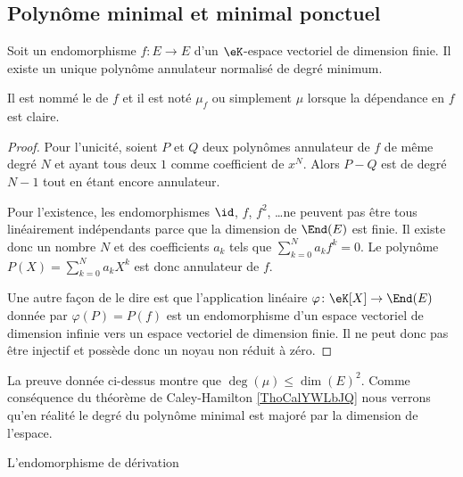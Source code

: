 \subsection{Polynôme minimal et minimal ponctuel}

\begin{lemmaDef}        \label{DefooOHUXooNkPWaB}
    Soit un endomorphisme \( f\colon E\to E\) d'un \( \eK\)-espace vectoriel de dimension finie. Il existe un unique polynôme annulateur normalisé de degré minimum.

    Il est nommé le  de \( f\) et il est noté \( \mu_f\) ou simplement \( \mu\) lorsque la dépendance en \( f\) est claire.
\end{lemmaDef}

\begin{proof}
    Pour l'unicité, soient \( P\) et \( Q\) deux polynômes annulateur de \( f\) de même degré \( N\) et ayant tous deux \( 1\) comme coefficient de \( x^N\). Alors \( P-Q\) est de degré \( N-1\) tout en étant encore annulateur.

    Pour l'existence, les endomorphismes \( \id\), \( f\), \( f^2\), \ldots ne peuvent pas être tous linéairement indépendants parce que la dimension de \( \End(E)\) est finie. Il existe donc un nombre \( N\) et des coefficients \( a_k\) tels que \( \sum_{k=0}^Na_kf^k=0\). Le polynôme \( P(X)=\sum_{k=0}^Na_kX^k\) est donc annulateur de \( f\).

    Une autre façon de le dire est que l'application linéaire \( \varphi\colon \eK[X]\to \End(E)\) donnée par \( \varphi(P)=P(f)\) est un endomorphisme d'un espace vectoriel de dimension infinie vers un espace vectoriel de dimension finie. Il ne peut donc pas être injectif et possède donc un noyau non réduit à zéro.
\end{proof}

\begin{remark}
    La preuve donnée ci-dessus montre que \( \deg(\mu)\leq \dim(E)^2\). Comme conséquence du théorème de Caley-Hamilton \ref{ThoCalYWLbJQ} nous verrons qu'en réalité le degré du polynôme minimal est majoré par la dimension de l'espace.
\end{remark}

\begin{example}
    L'endomorphisme de dérivation
\end{example}


